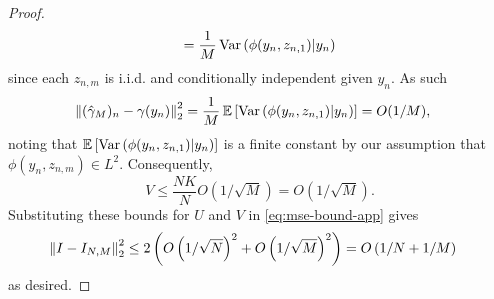 \begin{proof}
\begin{align*}
	= \frac{1}{M} \operatorname*{Var}\left(\phi(y_n, z_{n,1}) \middle| y_n \right)
	\end{align*}
	since each $z_{n,m}$ is i.i.d. and conditionally independent given $y_n$. As
	such
	\begin{align*}
	\left\lVert(\hat{\gamma}_M)_n - \gamma(y_n)\right\rVert_2^2
	&= \frac{1}{M} \, \mathbb{E} \left[ \operatorname*{Var} \left(\phi(y_n, z_{n,1}) \middle| y_n \right)\right] 
	= O(1/M),
	\end{align*}
	noting that $\mathbb{E} \left[ \operatorname*{Var} \left(\phi(y_n, z_{n,1}) \middle| y_n \right)\right]$ is a
	finite constant by our assumption that $\phi(y_n, z_{n,m}) \in L^2$. Consequently,
	\[
	V \leq \frac{NK}{N} O\left(1/\sqrt{M}\right) = O\left(1/\sqrt{M}\right).
	\]
	Substituting these bounds for $U$ and $V$ in \eqref{eq:mse-bound-app} gives
	\begin{align*}
	\left\lVert I - I_{N,M}\right\rVert_2^2
	&\leq 2\left(O\left(1/\sqrt{N}\right)^2 + O\left(1/\sqrt{M}\right)^2\right) 
	= O\left(1/N + 1/M\right)
	\end{align*}
	as desired.
\end{proof}